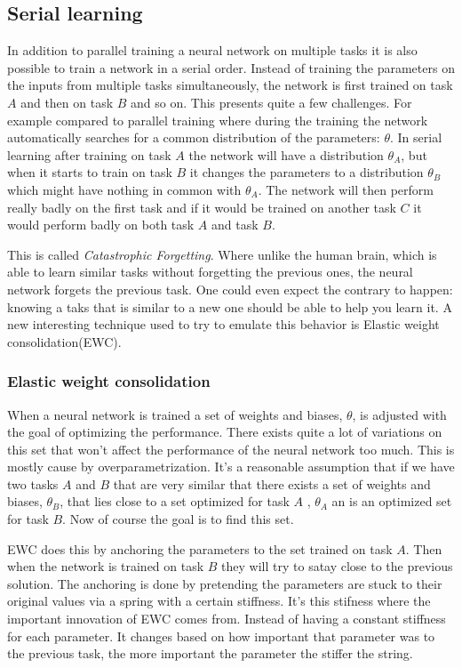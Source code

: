 \documentclass[a4paper]{article}
\begin{document}
\subsection{Serial learning}
In addition to parallel training a neural network on multiple tasks it is also possible to train a network in a serial order. Instead of training the parameters on the inputs from multiple tasks simultaneously, the network is first trained on task $A$ and then on task $B$ and so on. This presents quite a few challenges. For example compared to parallel training where during the training the network automatically searches for a common distribution of the parameters: $\theta$. In serial learning after training on task $A$ the network will have a distribution $\theta_{A}$, but when it starts to train on task $B$ it changes the parameters to a distribution $\theta_{B}$ which might have nothing in common with $\theta_{A}$. The network will then perform really badly on the first task and if it would be trained on another task $C$ it would perform badly on both task $A$ and task $B$.

This is called \emph{Catastrophic Forgetting}. Where unlike the human brain, which is able to learn similar tasks without forgetting the previous ones, the neural network forgets the previous task. One could even expect the contrary to happen: knowing a taks that is similar to a new one should be able to help you learn it. A new interesting technique used to try to emulate this behavior is Elastic weight consolidation(EWC)\cite{EWC}.

\subsubsection{Elastic weight consolidation}
When a neural network is trained a set of weights and biases, $\theta$, is adjusted with the goal of optimizing the performance. There exists quite a lot of variations on this set that won't affect the performance of the neural network too much. This is mostly cause by overparametrization. It's a reasonable assumption that if we have two tasks $A$ and $B$ that are very similar that there exists a set of weights and biases, $\theta_B$, that lies close to a set optimized for task $A$ , $\theta_A$ an is an optimized set for task $B$. Now of course the goal is to find this set.

EWC does this by anchoring the parameters to the set trained on task $A$. Then when the network is trained on task $B$ they will try to satay close to the previous solution. The anchoring is done by pretending the parameters are stuck to their original values via a spring with a certain stiffness. It's this stifness where the important innovation of EWC comes from. Instead of having a constant stiffness for each parameter. It changes based on how important that parameter was to the previous task, the more important the parameter the stiffer the string. 
\end{document}
